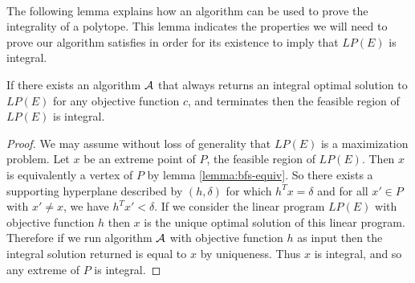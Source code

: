 \paragraph{}
The following lemma explains how an algorithm can be used to prove the integrality of a polytope. This lemma indicates the properties we will need to prove our algorithm satisfies in order for its existence to imply that $LP(E)$ is integral.
\begin{lemma} If there exists an algorithm $\mathcal{A}$ that always returns an integral optimal solution to $LP(E)$ for any objective function $c$, and terminates then the feasible region of $LP(E)$ is integral.
\end{lemma}
\begin{proof}
We may assume without loss of generality that $LP(E)$ is a maximization problem. Let $x$ be an extreme point of $P$, the feasible region of $LP(E)$. Then $x$ is equivalently a vertex of $P$ by lemma \ref{lemma:bfs-equiv}. So there exists a supporting hyperplane described by $(h,\delta)$ for which $h^Tx = \delta$ and for all $x' \in P$ with $x' \neq x$, we have $h^Tx' < \delta$. If we consider the linear program $LP(E)$ with objective function $h$ then $x$ is the unique optimal solution of this linear program. Therefore if we run algorithm $\mathcal{A}$  with objective function $h$ as input then the integral solution returned is equal to $x$ by uniqueness. Thus $x$ is integral, and so any extreme of $P$ is integral. 
\end{proof}
